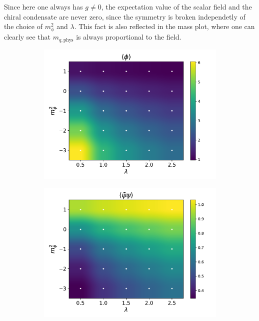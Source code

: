 Since here one always has $g \neq 0$, the expectation value of the scalar field and the chiral condensate are never zero, since the symmetry is broken independetly of the choice of $m_\phi^2$ and $\lambda$. This fact is also reflected in the mass plot,
where one can clearly see that $m_{q,\text{phys}}$ is always proportional to the field.
\begin{figure}[hbp]
    \centering
    \begin{subfigure}[b]{0.47\textwidth}
        \includegraphics[width=\textwidth]{figures/phase_diagram/m-lam/phase_diagram_phi.pdf}
    \end{subfigure}
    \begin{subfigure}[b]{0.47\textwidth}
        \includegraphics[width=\textwidth]{figures/phase_diagram/m-lam/phase_diagram_cond.pdf}

\end{subfigure}
\end{figure}
